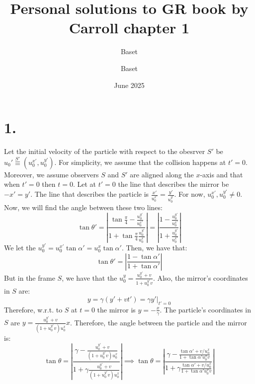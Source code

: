 \documentclass{article}
\title{Personal solutions to GR book by Carroll chapter 1}
\author{Baset}
\date{June 2025}
\begin{document}
\author{Baset}
\maketitle
\section*{1.}
Let the initial velocity of the particle with respect to the obesrver $S'$ be $u_0' \stackrel{S'}{\equiv} (u_0^{x'}, u_0^{y'})$.
For simplicity, we assume that the collision happens at $t' = 0$. Moreover, we assume observers $S$ and $S'$ are aligned along the $x$-axis and that when $t'=0$ then 
$t = 0$. Let at $t'=0$ the line that describes the mirror be $-x' = y'$. The line that describes the particle is $\frac{x'}{u_0^{x'}} = \frac{y'}{u_0^{y'}}$. For now, 
$u_0^{x'}, u_0^{y'} \ne 0$. Now, we will find the angle between these two lines:
\begin{equation}
    \tan \theta' = |\frac{\tan{\frac{\pi}{4}} - \frac{u_0^{y'}}{u_0^{x'}}}{1 + \tan{\frac{\pi}{4}} \frac{u_0^{y'}}{u_0^{x'}}}| = |\frac{1 - \frac{u_0^{y'}}{u_0^{x'}}}{1 + \frac{u_0^{y'}}{u_0^{x'}}} |
\end{equation}
We let the $u_0^{y'} = u_0^{x'}\tan{\alpha'} = u_0^{x}\tan{\alpha'}$. Then, we have that:
\begin{equation}
    \tan \theta' = |\frac{1 - \tan{\alpha'}}{1 + \tan{\alpha'}}|
\end{equation}
But in the frame $S$, we have that the $u_0^{y} = \frac{u_0^{y'}+v}{1+u_0^{y'}v}$. Also, the mirror's coordinates in $S$ are:
\begin{equation}
    y = \gamma(y' + vt') = \gamma y'|_{t'=0}
\end{equation}
Therefore, w.r.t. to $S$ at $t=0$ the mirror is $y = -\frac{x}{\gamma}$. The particle's coordinates in $S$ are $y = 
\frac{u_0^{y'}+v}{(1+u_0^{y'}v)u_0^{x}}x$. Therefore, the angle between the particle and the mirror is:
\begin{equation}
    \tan \theta = |\frac{\gamma - \frac{u_0^{y'}+v}{(1+u_0^{y'}v)u_0^{x}}}{1 + \gamma \frac{u_0^{y'}+v}{(1+u_0^{y'}v)u_0^{x}}}| \implies
    \tan \theta = |\frac{\gamma - \frac{\tan{\alpha'}+ v/u_0^{x}}{1+\tan{\alpha'}u_0^{x}v}}{1 + \gamma \frac{\tan{\alpha'}+ v/u_0^{x}}{1+\tan{\alpha'}u_0^{x}v}}|
\end{equation}
\end{document}

